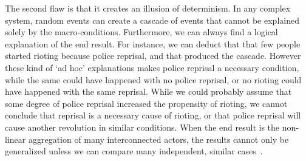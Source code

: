 The second flaw is that it creates an illusion of determinism.
In any complex system, random events can create a cascade of events that cannot be explained solely by the macro-conditions. 
Furthermore, we can always find a logical explanation of the end result.
For instance, we can deduct that that few people started rioting because police reprisal, and that produced the cascade.
However these kind of `ad hoc' explanations makes police reprisal a necessary condition, 
while the same could have happened with no police reprisal, 
or no rioting could have happened with the same reprisal.
While we could probably assume that some degree of police reprisal increased the propensity of rioting,
we cannot conclude that reprisal is a necessary cause of rioting,
or that police reprisal will cause another revolution in similar conditions.
When the end result is the non-linear aggregation of many interconnected actors,
the results cannot only be generalized
unless we can compare many independent, similar cases~\citep{watts2007}.


